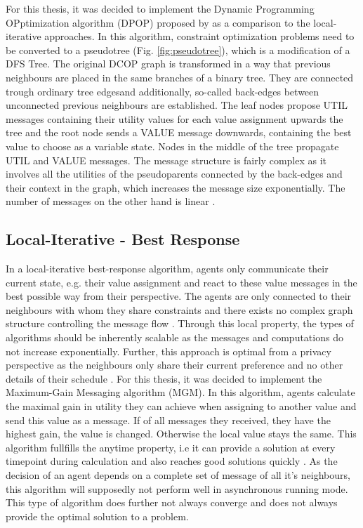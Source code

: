 For this thesis, it was decided to implement the Dynamic Programming OPptimization algorithm (DPOP) proposed by \cite{Petcu2003} as a comparison to the local-iterative approaches. In this algorithm, constraint optimization problems need to be converted to a pseudotree (Fig. \ref{fig:pseudotree}), which is a modification of a DFS Tree. The original DCOP graph is transformed in a way that previous neighbours are placed in the same branches of a binary tree. They are connected trough ordinary tree edgesand additionally, so-called back-edges between unconnected previous neighbours are established. The leaf nodes propose UTIL messages containing their utility values for each value assignment upwards the tree and the root node sends a VALUE message downwards, containing the best value to choose as a variable state. Nodes in the middle of the tree propagate UTIL and VALUE messages. The message structure is fairly complex as it involves all the utilities of the pseudoparents connected by the back-edges and their context in the graph, which increases the message size exponentially. The number of messages on the other hand is linear \cite{Petcu2003}.

\subsection{Local-Iterative - Best Response}

In a local-iterative best-response algorithm, agents only communicate their current state, e.g. their value assignment and react to these value messages in the best possible way from their perspective. The agents are only connected to their neighbours with whom they share constraints and there exists no complex graph structure controlling the message flow \cite{Chapman2011}. Through this local property, the types of algorithms should be inherently scalable as the messages and computations do not increase exponentially. Further, this approach is optimal from a privacy perspective as the neighbours only share their current preference and no other details of their schedule \cite{Chapman2010}. %
\newline\newline
For this thesis, it was decided to implement the Maximum-Gain Messaging algorithm (MGM). In this algorithm, agents  calculate the maximal gain in utility they can achieve when assigning to another value and send this value as a message. If of all messages they received, they have the highest gain, the value is changed. Otherwise the local value stays the same. This algorithm fullfills the anytime property, i.e it can provide a solution at every timepoint during calculation and also reaches good solutions quickly \cite{Chapman2010}. As the decision of an agent depends on a complete set of message of all it's neighbours, this algorithm will supposedly not perform well in asynchronous running mode. This type of algorithm does further not always converge and does not always provide the optimal solution to a problem.

